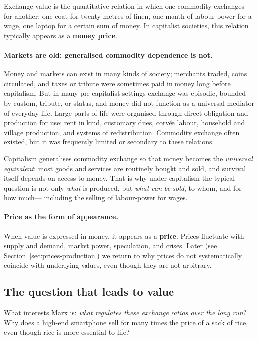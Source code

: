 Exchange-value is the quantitative relation in which one commodity exchanges for another: one coat for twenty
metres of linen, one month of labour-power for a wage, one laptop for a certain sum of money. In capitalist societies,
this relation typically appears as a \textbf{money price}.

\paragraph{Markets are old; generalised commodity dependence is not.}
Money and markets can exist in many kinds of society; merchants traded, coins circulated, and taxes or tribute
were sometimes paid in money long before capitalism. But in many pre-capitalist settings exchange was episodic,
bounded by custom, tribute, or status, and money did not function as a universal mediator of everyday life.
Large parts of life were organised through direct obligation and production for use: rent in kind, customary dues,
corv\'ee labour, household and village production, and systems of redistribution. Commodity exchange often existed,
but it was frequently limited or secondary to these relations.

Capitalism generalises commodity exchange so that money becomes the \emph{universal equivalent}: most goods and
services are routinely bought and sold, and survival itself depends on access to money. That is why under capitalism
the typical question is not only \emph{what} is produced, but \emph{what can be sold}, to whom, and for how much---
including the selling of labour-power for wages.

\paragraph{Price as the form of appearance.}
When value is expressed in money, it appears as a \textbf{price}. Prices fluctuate with supply and demand,
market power, speculation, and crises. Later (see Section~\ref{sec:prices-production}) we return to why prices do not
systematically coincide with underlying values, even though they are not arbitrary.

\subsection{The question that leads to value}
\label{sec:question-leads-to-value}

What interests Marx is: \emph{what regulates these exchange ratios over the long run}? Why does a high-end smartphone
sell for many times the price of a sack of rice, even though rice is more essential to life?

